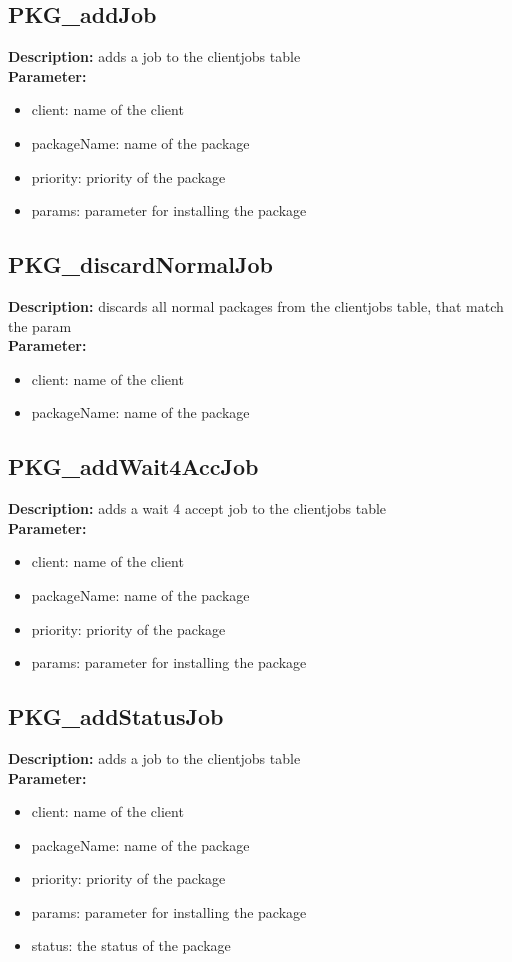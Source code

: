 \subsection{PKG\_addJob}
\textbf{Description:} adds a job to the clientjobs table\\
\textbf{Parameter:}
\begin{itemize}
\item client: name of the client
\item packageName: name of the package
\item priority: priority of the package
\item params: parameter for installing the package
\end{itemize}

\subsection{PKG\_discardNormalJob}
\textbf{Description:} discards all normal packages from the clientjobs table, that match the param\\
\textbf{Parameter:}
\begin{itemize}
\item client: name of the client
\item packageName: name of the package
\end{itemize}

\subsection{PKG\_addWait4AccJob}
\textbf{Description:} adds a wait 4 accept job to the clientjobs table\\
\textbf{Parameter:}
\begin{itemize}
\item client: name of the client
\item packageName: name of the package
\item priority: priority of the package
\item params: parameter for installing the package
\end{itemize}

\subsection{PKG\_addStatusJob}
\textbf{Description:} adds a job to the clientjobs table\\
\textbf{Parameter:}
\begin{itemize}
\item client: name of the client
\item packageName: name of the package
\item priority: priority of the package
\item params: parameter for installing the package
\item status: the status of the package
\end{itemize}

